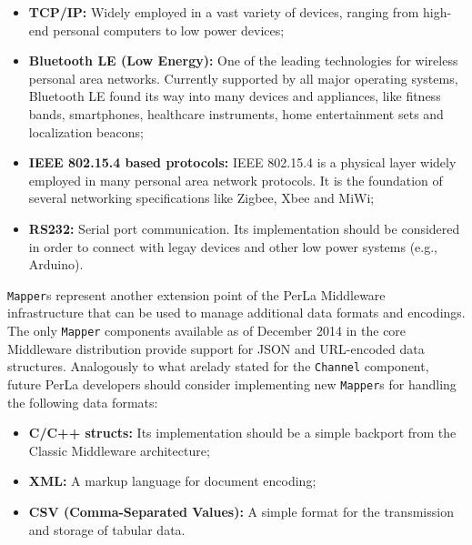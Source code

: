 \begin{itemize}

    \item \textbf{TCP/IP:} Widely employed in a vast variety of devices,
    ranging from high-end personal computers to low power devices;

\item \textbf{Bluetooth LE (Low Energy):} One of the leading technologies for
    wireless personal area networks. Currently supported by all major operating
    systems, Bluetooth LE found its way into many devices and appliances, like
    fitness bands, smartphones, healthcare instruments, home entertainment sets
    and localization beacons;

    \item \textbf{IEEE 802.15.4 based protocols:} IEEE 802.15.4 is a physical
    layer widely employed in many personal area network protocols. It is the
    foundation of several networking specifications like Zigbee, Xbee and MiWi;

    \item \textbf{RS232:} Serial port communication. Its implementation should
    be considered in order to connect with legay devices and other low power
    systems (e.g., Arduino).

\end{itemize}

\texttt{Mapper}s represent another extension point of the PerLa Middleware
infrastructure that can be used to manage additional data formats and
encodings. The only \texttt{Mapper} components available as of December 2014 in
the core Middleware distribution provide support for JSON and URL-encoded data
structures. Analogously to what arelady stated for the \texttt{Channel}
component, future PerLa developers should consider implementing new
\texttt{Mapper}s for handling the following data formats:

\begin{itemize}

    \item \textbf{C/C++ structs:} Its implementation should be a simple
    backport from the Classic Middleware architecture;

    \item \textbf{XML:} A markup language for document encoding;

    \item \textbf{CSV (Comma-Separated Values):} A simple format for the
    transmission and storage of tabular data.

\end{itemize}

